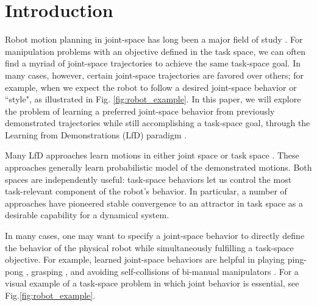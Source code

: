\documentclass[letterpaper, 10 pt, conference,fleqn]{ieeeconf}
\begin{document}



\IEEEpeerreviewmaketitle
\section{Introduction}
\label{sec:intro}
Robot motion planning in joint-space has long been a major field of study \cite{kelly2006control}. For manipulation problems with an objective defined in the task space, %
 we can often find a myriad of joint-space trajectories to achieve the same task-space goal. In many cases, however, certain joint-space trajectories are favored over others; for example, when we expect the robot to follow a desired joint-space behavior or ``style", as illustrated in Fig. \ref{fig:robot_example}. In this paper, we will explore the problem of learning a preferred joint-space behavior from previously demonstrated trajectories while still accomplishing a task-space goal, through the Learning from Demonstrations (LfD) paradigm \cite{billard2008robot,Argall:RAS:2009}.

Many LfD approaches learn motions in either joint space %
\cite{Garrido:Neuro:2015,Schaal:AI:2002} or task space %
\cite{Pastor:ICRA:2009,Calinon:ISR:2015}. These approaches generally learn probabilistic model of the demonstrated motions. %
Both %
spaces are independently useful:  task-space behaviors let us control the most task-relevant component of the robot's behavior. In particular, a number of approaches have pioneered stable convergence to an attractor in task space %
 \cite{khansari2011learning, Neumann:RAS:2015}as a desirable capability for a dynamical system.

	In many cases, one may want to specify a joint-space behavior to directly define the behavior of the physical robot while simultaneously fulfilling a task-space objective. For example, %
learned joint-space behaviors are helpful in playing ping-pong \cite{huang2016jointly}, grasping \cite{calinon2010learning}, and avoiding self-collisions of bi-manual manipulators \cite{silverio2017learning}. For a visual example of a task-space problem in which joint behavior is essential, see Fig.\ref{fig:robot_example}.
\end{document}
